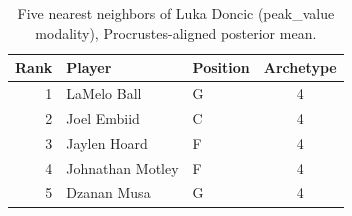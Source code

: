 \begin{table}[htbp]
  \centering\small
  \begin{tabular}{rllc}
    \toprule
    Rank & Player & Position & Archetype \\
    \midrule
    1 & LaMelo Ball & G & 4 \\
    2 & Joel Embiid & C & 4 \\
    3 & Jaylen Hoard & F & 4 \\
    4 & Johnathan Motley & F & 4 \\
    5 & Dzanan Musa & G & 4 \\
    \bottomrule
  \end{tabular}
  \caption{Five nearest neighbors of Luka Doncic (peak_value modality), Procrustes-aligned posterior mean.}
  \label{tab:Luka_Doncic_neighbors_peak_value}
\end{table}

